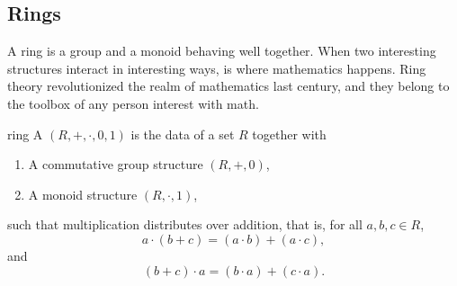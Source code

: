 
\subsection{Rings}

A ring is a group and a monoid behaving well together. When two interesting structures interact in interesting ways, is where mathematics happens. Ring theory revolutionized the realm of mathematics last century, and they belong to the toolbox of any person interest with math.

\begin{cdef}{}{ring}
    A  \( (R, +, \cdot, 0, 1) \) is the data of a set \( R \) together with
    \begin{enumerate}
        \item A commutative group structure \( (R, +, 0) \),
        \item A monoid structure \( (R, \cdot, 1) \),
    \end{enumerate}
    such that multiplication distributes over addition, that is, for all \( a, b, c \in R \),
    \begin{equation*}
        a \cdot(b + c) = (a \cdot b) + (a \cdot c),
    \end{equation*}
    and
    \begin{equation*}
        (b + c)\cdot a = (b \cdot a) + (c \cdot a).
    \end{equation*}
\end{cdef}

